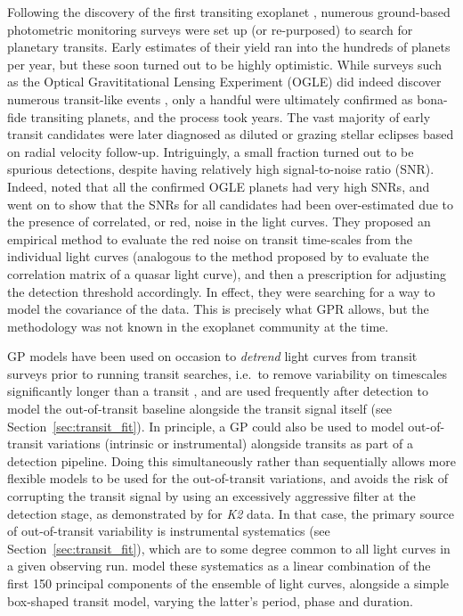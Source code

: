 \documentclass[letterpaper]{ar-1col}
\begin{document}
Following the discovery of the first transiting exoplanet \citep{2000ApJ...529L..41H,2000ApJ...529L..45C}, numerous ground-based photometric monitoring surveys were set up (or re-purposed) to search for planetary transits. Early estimates of their yield \citep[see e.g.][]{2003ASPC..294..361H} ran into the hundreds of planets per year, but these soon turned out to be highly optimistic. While surveys such as the Optical Gravititational Lensing Experiment (OGLE) did indeed discover numerous transit-like events
\citep[see e.g.][]{2002AcA....52....1U}, only a handful were ultimately confirmed as bona-fide transiting planets, and the process took years. %
The vast majority of early transit candidates were later diagnosed as diluted or grazing stellar eclipses based on radial velocity follow-up.
Intriguingly, a small fraction turned out to be spurious detections, despite having relatively high signal-to-noise ratio (SNR). Indeed, \citet{2006MNRAS.373..231P} noted that all the confirmed OGLE planets had very high SNRs, and went on to show that the SNRs for all candidates had been over-estimated due to the presence of correlated, or red, noise in the light curves. They proposed an empirical method to evaluate the red noise on transit time-scales from the individual light curves (analogous to the method proposed by \citealt{prh92a} to evaluate the correlation matrix of a quasar light curve), and then a prescription for adjusting the detection threshold accordingly. In effect, they were searching for a way to model the covariance of the data. This is precisely what GPR allows, but the methodology was not known in the exoplanet community at the time.

GP models have been used on occasion to \textit{detrend} light curves from transit surveys prior to running transit searches, i.e.\ to remove variability on timescales significantly longer than a transit \citep[see e.g.][]{2016ApJS..226....7C}, and are used frequently after detection to model the out-of-transit baseline alongside the transit signal itself (see Section~\ref{sec:transit_fit}). In principle, a GP could also be used to model out-of-transit variations (intrinsic or instrumental) alongside transits as part of a detection pipeline. Doing this simultaneously rather than sequentially allows more flexible models to be used for the out-of-transit variations, and avoids the risk of corrupting the transit signal by using an excessively aggressive filter at the detection stage, as demonstrated by \citet{2015ApJ...806..215F} for \textit{K2} data. In that case, the primary source of out-of-transit variability is instrumental systematics (see Section~\ref{sec:transit_fit}), which are to some degree common to all light curves in a given observing run. \citet{2015ApJ...806..215F} model these systematics as a linear combination of the first 150 principal components of the ensemble of light curves, alongside a simple box-shaped transit model, varying the latter's period, phase and duration.
\end{document}

